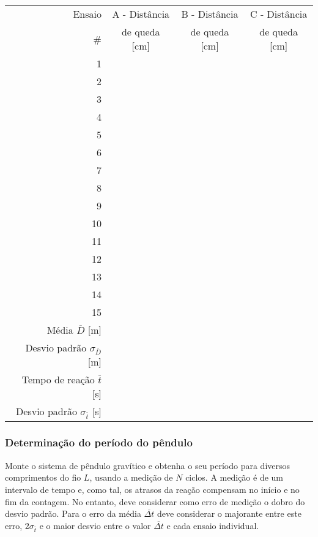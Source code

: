 \documentclass[a4paper,12pt]{article}      %
\begin{document}
\begin{center}
\begin{footnotesize}
\begin{tabular}{|r|c|c|c|}
\hline
Ensaio  & A - Distância & B - Distância & C - Distância  \\
\# & de queda [cm] & de queda [cm] & de queda [cm]\\
\hline \hline
1 & & & \\
\hline
2 & &  &\\
\hline 3 & & & \\
\hline 4 & & & \\
\hline 5 & & & \\
\hline 6 & & & \\
\hline 7 & & & \\
\hline 8 & & & \\
\hline 9 & & & \\
\hline 10 & & & \\
\hline 11 & & & \\
\hline 12 & & & \\
\hline 13 & & & \\
\hline 14 & & & \\
\hline 15 & & & \\
\hline \hline
Média $\overline{D}$ [m] & &  & \\ \hline
Desvio padrão  $\sigma_{\overline{D}}$ [m] & & & \\ \hline
Tempo de reação $\overline{t}$ [s] & & & \\ \hline %
Desvio padrão  $\sigma_{\overline{t}}$ [s] & & & \\
\hline

\end{tabular}
\end{footnotesize}
\end{center}

\subsubsection*{\sf Determinação do período do pêndulo}
Monte o sistema de pêndulo gravítico e obtenha o seu período para diversos comprimentos do fio $L$, usando a medição de $N$ ciclos. 
A medição é de um intervalo de tempo e, como tal, os atrasos da reação compensam no início e no fim da contagem. No entanto, deve considerar como erro de medição o dobro do desvio padrão. Para o erro da média $\overline{\Delta t}$ deve considerar o majorante entre este erro, $2 \sigma_{\overline{t}}$ e o maior desvio entre o valor  $\overline{\Delta  t} $ e cada ensaio individual. 
\end{document}

